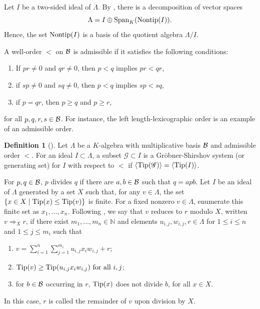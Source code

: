 \documentclass[10pt, reqno]{amsart}
\theoremstyle{definition}
\newtheorem{definition}[theorem]{Definition}
\theoremstyle{remark}
\numberwithin{equation}{section}
\begin{document}
Let $I$ be a two-sided ideal of $\Lambda$. By \cite[Theorem 2.1]{Gre99}, there is a decomposition of vector spaces
    \[\Lambda = I \oplus \mathrm{Span}_K(\mathrm{Nontip}(I)).\]
Hence, the set \(\mathrm{Nontip}(I)\) is a basis of the quotient algebra \(\Lambda/I\).

A well-order \(<\) on \(\mathcal{B}\) is admissible if  it satisfies the following conditions: 
\begin{enumerate}
\item If \(pr \neq 0\) and \(qr \neq 0\), then \(p < q\) implies \(pr < qr\),
\item if \(sp \neq 0\) and \(sq \neq 0\), then \(p < q\) implies \(sp < sq\),
\item if \(p = qr\), then \(p \ge q\) and \(p \ge r\),
\end{enumerate}
for all \(p, q, r, s \in \mathcal{B}\). 
For instance, the left length-lexicographic order is an example of an admissible order.

\begin{definition} [{\cite[Definition 2.4]{Gre99}}]
     Let \(\Lambda\) be a \(K\)-algebra with multiplicative basis \(\mathcal{B}\) and admissible order \(<\). For an ideal \( I\subset \Lambda\), a subset \( \mathscr{G} \subset I \) is a Gr\"obner-Shirshov system (or generating set) for \( I \) with respect to \( < \) if  \(\langle \mathrm{Tip}(\mathscr{G}) \rangle = \langle \mathrm{Tip}(I) \rangle \).
\end{definition}



For \(p,q \in \mathcal{B} \), \(p\) divides \(q\) if there are \(a,b \in \mathcal{B}\) such that \(q=apb\). Let \(I\) be an ideal of \(\Lambda\) generated by a  set \(X\) such that, for any \(v\in \Lambda\), the set \(\{x\in X \mid \mathrm{Tip}(x) \le \mathrm{Tip}(v)\}\) is finite.  
For a fixed nonzero \(v\in \Lambda\), enumerate this finite set as \(x_1, \dots, x_n\). Following \cite[Section 2.3.2]{Gre99}, we say that \(v\) reduces to \(r\) modulo \(X\), written \(v \Rightarrow_X r\), if
there exist \( m_1, \ldots, m_n \in \mathbb{N}\) and elements \( u_{i,j}, w_{i,j}, r \in \Lambda \) for \( 1\le i \le n\) and \( 1\le j \le m_i \) such that \begin{enumerate}
    \item \( v = \sum_{i=1}^n \sum_{j=1}^{m_i} u_{i,j} x_i w_{i,j} + r\);
    \item \(\mathrm{Tip}(v) \ge \mathrm{Tip}(u_{i,j} x_i w_{i,j}) \text{ for all } i, j\);
    \item for \( b \in \mathcal{B} \) occurring in \( r \), \( \mathrm{Tip}(x) \) does not divide \( b \), for all \( x \in X \).
\end{enumerate}
In this case, \(r\) is called the remainder of \(v\) upon division by \(X\).
\end{document}
